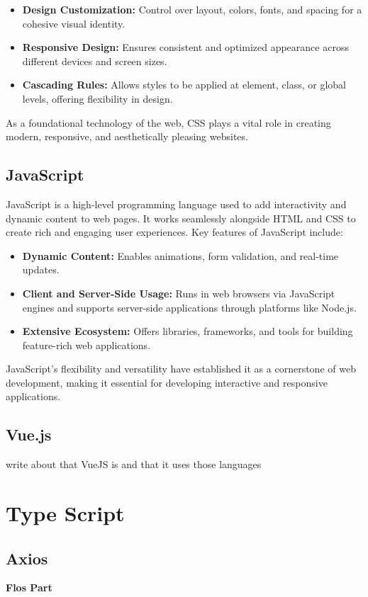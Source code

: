 \begin{itemize}
    \item \textbf{Design Customization:} Control over layout, colors, fonts, and spacing for a cohesive visual identity.
    \item \textbf{Responsive Design:} Ensures consistent and optimized appearance across different devices and screen sizes.
    \item \textbf{Cascading Rules:} Allows styles to be applied at element, class, or global levels, offering flexibility in design.
\end{itemize}

As a foundational technology of the web, CSS plays a vital role in creating modern, responsive, and aesthetically pleasing websites.

\cite{CSS-Wikipedia}

\subsection{JavaScript}

JavaScript is a high-level programming language used to add interactivity and dynamic content to web pages. It works seamlessly alongside HTML and CSS to create rich and engaging user experiences. Key features of JavaScript include:

\begin{itemize}
    \item \textbf{Dynamic Content:} Enables animations, form validation, and real-time updates.
    \item \textbf{Client and Server-Side Usage:} Runs in web browsers via JavaScript engines and supports server-side applications through platforms like Node.js.
    \item \textbf{Extensive Ecosystem:} Offers libraries, frameworks, and tools for building feature-rich web applications.
\end{itemize}

JavaScript’s flexibility and versatility have established it as a cornerstone of web development, making it essential for developing interactive and responsive applications.

\cite{JavaScript-Wikipedia}

\subsection{Vue.js}

write about that VueJS is and that it uses those languages

\section{Type Script}

\subsection{Axios}

\textbf{Flos Part}
